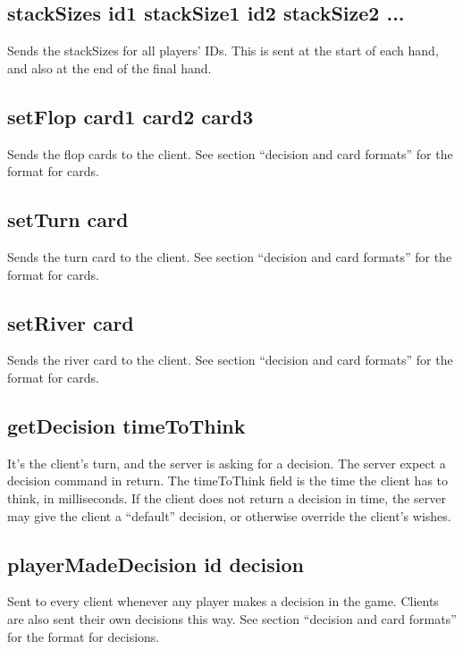 \documentclass{article}
\begin{document}
\subsection*{stackSizes \textlangle{}id1 stackSize1\textrangle{} \textlangle{}id2 stackSize2\textrangle{} ... }
Sends the stackSizes for all players' IDs. This is sent at the start of each hand, and also at the end of the final hand.

\subsection*{setFlop \textlangle{}card1\textrangle{} \textlangle{}card2\textrangle{}  \textlangle{}card3\textrangle{}}
Sends the flop cards to the client. See section ``decision and card formats'' for the format for cards.

\subsection*{setTurn \textlangle{}card\textrangle{}}
Sends the turn card to the client. See section ``decision and card formats'' for the format for cards.

\subsection*{setRiver \textlangle{}card\textrangle{}}
Sends the river card to the client. See section ``decision and card formats'' for the format for cards.

\subsection*{getDecision \textlangle{}timeToThink\textrangle{}}
It's the client's turn, and the server is asking for a decision. The server expect a decision command in return. The timeToThink field is the time the client has to think, in milliseconds. If the client does not return a decision in time, the server may give the client a ``default'' decision, or otherwise override the client's wishes.

\subsection*{playerMadeDecision \textlangle{}id\textrangle{} \textlangle{}decision\textrangle{}}
Sent to every client whenever any player makes a decision in the game. Clients are also sent their own decisions this way. See section ``decision and card formats'' for the format for decisions.
\end{document}
